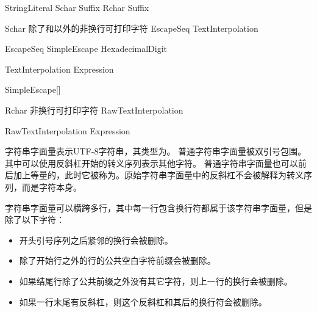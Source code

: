 \begin{bnf}{StringLiteral}
     Schar\bnfs {} Suffix\bnfq \br
    \bnfp {} Rchar\bnfs {} \bnfp Suffix\bnfq
\end{bnf}

\begin{bnf}{Schar}
    \textnormal{除了\terminal{\textbackslash}和以外的非换行可打印字符} \br
    EscapeSeq \br
    TextInterpolation
\end{bnf}

\begin{bnf}{EscapeSeq}
    \terminal{\textbackslash} SimpleEscape \br
     HexadecimalDigit\bnfp \terminal{\}}
\end{bnf}

\begin{bnf}{TextInterpolation}
    \terminal{\textbackslash{}(} Expression \terminal{)}
\end{bnf}

\begin{bnf}{SimpleEscape}[\oneof]
\end{bnf}

\begin{bnf}{Rchar}
    \textnormal{非换行可打印字符} \br
    RawTextInterpolation
\end{bnf}

\begin{bnf}{RawTextInterpolation}
    \terminal{\textbackslash} \bnfp \terminal{(}  Expression \terminal{)}
\end{bnf}

\pnum
字符串字面量表示UTF-8字符串，其类型为。
普通字符串字面量被双引号包围。其中可以使用反斜杠开始的转义序列表示其他字符。
普通字符串字面量也可以前后加上等量的，此时它被称为。原始字符串字面量中的反斜杠不会被解释为转义序列，而是字符本身。

\pnum
字符串字面量可以横跨多行，其中每一行包含换行符都属于该字符串字面量，但是除了以下字符：

\begin{itemize}
    \item 开头引号序列之后紧邻的换行会被删除。
    \item 除了开始行之外的行的公共空白字符前缀会被删除。
    \item 如果结尾行除了公共前缀之外没有其它字符，则上一行的换行会被删除。
    \item 如果一行末尾有反斜杠，则这个反斜杠和其后的换行符会被删除。
\end{itemize}

